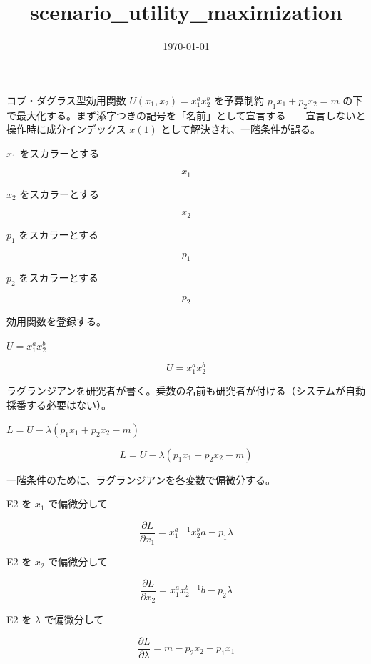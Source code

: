 \documentclass[dvipdfmx,a4paper,11pt]{jsarticle}
\title{scenario\_utility\_maximization}
\date{\today}
\begin{document}
\maketitle

コブ・ダグラス型効用関数 $U(x_1,x_2)=x_1^ax_2^b$ を予算制約 $p_1x_1+p_2x_2=m$ の下で最大化する。まず添字つきの記号を「名前」として宣言する——宣言しないと操作時に成分インデックス $x(1)$ として解決され、一階条件が誤る。

$x_1$ をスカラーとする

\[
  x_1
\]

$x_2$ をスカラーとする

\[
  x_2
\]

$p_1$ をスカラーとする

\[
  p_1
\]

$p_2$ をスカラーとする

\[
  p_2
\]

効用関数を登録する。

$U = x_1^a x_2^b$

\begin{equation}
  U = x_1^a x_2^b
  \label{eq:E1}
\end{equation}

ラグランジアンを研究者が書く。乗数の名前も研究者が付ける（システムが自動採番する必要はない）。

$L = U - \lambda (p_1 x_1 + p_2 x_2 - m)$

\begin{equation}
  L = U - \lambda (p_1 x_1 + p_2 x_2 - m)
  \label{eq:E2}
\end{equation}

一階条件のために、ラグランジアンを各変数で偏微分する。

E2 を $x_1$ で偏微分して

\begin{equation}
  \frac{\partial L}{\partial x_1} = x_{1}^{a-1} x_{2}^{b} a-p_{1} \lambda
  \label{eq:E3}
\end{equation}

E2 を $x_2$ で偏微分して

\begin{equation}
  \frac{\partial L}{\partial x_2} = x_{1}^{a} x_{2}^{b-1} b-p_{2} \lambda
  \label{eq:E4}
\end{equation}

E2 を $\lambda$ で偏微分して

\begin{equation}
  \frac{\partial L}{\partial \lambda} = m-p_{2} x_{2}-p_{1} x_{1}
  \label{eq:E5}
\end{equation}
\end{document}
